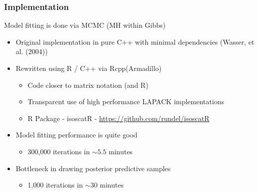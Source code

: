 \documentclass[t]{beamer}\usepackage[]{graphicx}\usepackage[]{color}
\begin{document}
\begin{frame}
\frametitle{Implementation}

Model fitting is done via MCMC (MH within Gibbs) \\
\begin{itemize} \addtolength{\itemsep}{3mm}
\item Original implementation in pure C++ with minimal dependencies (Wasser, et al. (2004))
\item Rewritten using R / C++ via Rcpp(Armadillo) 
\begin{itemize}
\item Code closer to matrix notation (and R)
\item Transparent use of high performance LAPACK implementations
\item R Package - isoscatR - \url{https://github.com/rundel/isoscatR}
\end{itemize}
\item Model fitting performance is quite good
\begin{itemize}
  \item 300,000 iterations in $\sim 5.5$ minutes
\end{itemize}
\item Bottleneck in drawing posterior predictive samples
\begin{itemize}
  \item1,000 iterations in $\sim 30$ minutes
\end{itemize}
\end{itemize}

\end{frame}

\end{document}
